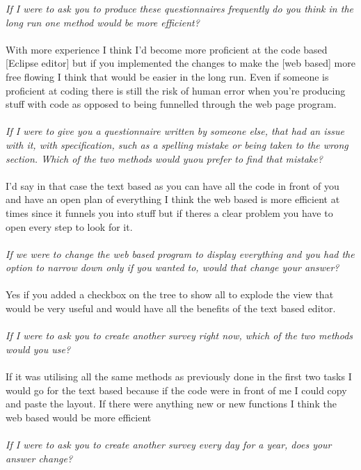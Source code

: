 \textit{If I were to ask you to produce these questionnaires frequently do you think in the long run one method would be more efficient?}
\\
\\
With more experience I think I'd become more proficient at the code based [Eclipse editor] but if you implemented the changes to make the [web based] more free flowing I think that would be easier in the long run. Even if someone is proficient at coding there is still the risk of human error when you're producing stuff with code as opposed to being funnelled through the web page program.
\\
\\
\textit{If I were to give you a questionnaire written by someone else, that had an issue with it, with specification, such as a spelling mistake or being taken to the wrong section. Which of the two methods would yuou prefer to find that mistake?}
\\
\\
I'd say in that case the text based as you can have all the code in front of you and have an open plan of everything I think the web based is more efficient at times since it funnels you into stuff but if theres a clear problem you have to open every step to look for it.
\\
\\
\textit{If we were to change the web based program to display everything and you had the option to narrow down only if you wanted to, would that change your answer?}
\\
\\
Yes if you added a checkbox on the tree to show all to explode the view that would be very useful and would have all the benefits of the text based editor.
\\
\\
\textit{If I were to ask you to create another survey right now, which of the two methods would you use?}
\\
\\
If it was utilising all the same methods as previously done in the first two tasks I would go for the text based because if the code were in front of me I could copy and paste the layout. If there were anything new or new functions I think the web based would be more efficient
\\
\\
\textit{If I were to ask you to create another survey every day for a year, does your answer change?}
\\
\\
